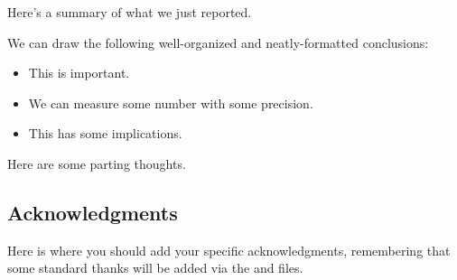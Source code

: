 \documentclass[\docopts]{\docclass}
\begin{document}
Here's a summary of what we just reported.

We can draw the following well-organized and neatly-formatted conclusions:
\begin{itemize}
  \item This is important.
  \item We can measure some number with some precision.
  \item This has some implications.
\end{itemize}

Here are some parting thoughts.



\subsection*{Acknowledgments}

Here is where you should add your specific acknowledgments, remembering that some standard thanks will be added via the  and  files.







\end{document}
